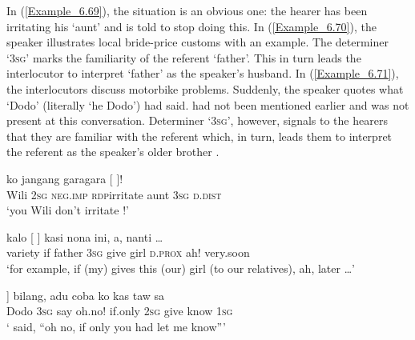 In (\ref{Example_6.69}), the situation is an obvious one: the hearer  has been irritating his  ‘aunt’ and is told to stop doing this. In (\ref{Example_6.70}), the speaker illustrates local bride-price customs with an example. The determiner  ‘\textsc{3sg}’ marks the familiarity of the referent  ‘father’. This in turn leads the interlocutor to interpret  ‘father’ as the speaker’s husband. In (\ref{Example_6.71}), the interlocutors discuss motorbike problems. Suddenly, the speaker quotes what  ‘Dodo’ (literally ‘he Dodo’) had said.  had not been mentioned earlier and was not present at this conversation. Determiner  ‘\textsc{3sg}’, however, signals to the hearers that they are familiar with the referent which, in turn, leads them to interpret the referent as the speaker’s older brother .


\ea
\label{Example_6.69}
 {ko} {jangang} {gara{\Tilde}gara} {[} {} {]}!\\ %
 Wili  \textsc{2sg}  \textsc{neg.imp}  \textsc{rdp}{\Tilde}irritate  aunt  \textsc{3sg}  \textsc{d.dist}\\

\glt
‘you Wili don’t irritate !’ \textstyleExampleSource{[081023-001-Cv.0038]}
\z

\ea
\label{Example_6.70}
 {kalo} {[} {]} {kasi} {nona} {ini,} {a,} {nanti} {\ldots}\\ %
 variety  if  father  \textsc{3sg}  give  girl  \textsc{d.prox}  ah!  very.soon  \\

 ‘for example, if (my)  gives this (our) girl (to our relatives), ah, later {\ldots}’ \textstyleExampleSource{[081006-024-CvEx.0079]}
\z

\ea
\label{Example_6.71}
\gll {[\bluebold{Dodo}} {]} {bilang,} {adu} {coba} {ko} {kas} {taw} {sa}\\ %
 Dodo  \textsc{3sg}  say  oh.no!  if.only  \textsc{2sg}  give  know  \textsc{1sg}\\
\glt
‘ said, ``oh no, if only you had let me know''' \textstyleExampleSource{[081014-003-Cv.0029]}
\z



